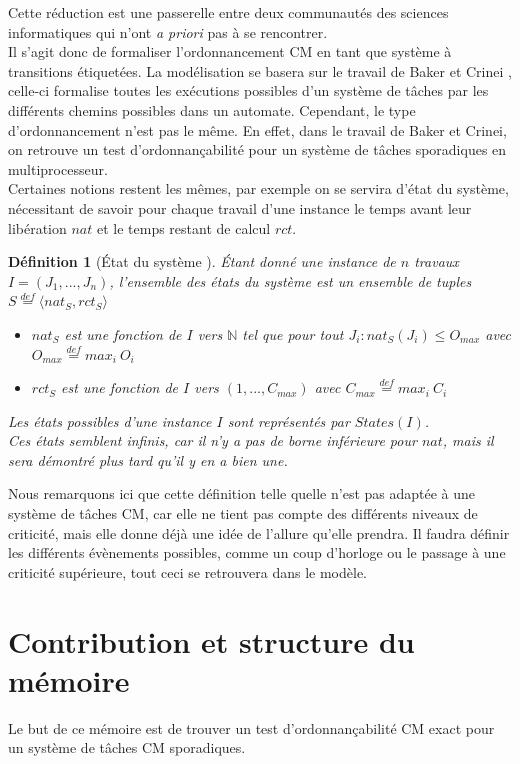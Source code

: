 \documentclass[12pt,a4paper,oneside]{book}
\theoremstyle{break}
\newtheorem{defin}{Définition}[chapter]
\theoremstyle{breakplain}
\begin{document}
Cette réduction est une passerelle entre deux communautés des sciences informatiques qui n'ont \textit{a priori} pas à se rencontrer.\\

Il s'agit donc de formaliser l'ordonnancement CM en tant que système à transitions étiquetées. La modélisation se basera sur le travail de Baker et Crinei \cite{bakerbrute}, celle-ci formalise toutes les exécutions possibles d'un système de tâches par les différents chemins possibles dans un automate. Cependant, le type d'ordonnancement n'est pas le même. En effet, dans le travail de Baker et Crinei, on retrouve un test d'ordonnançabilité pour un système de tâches sporadiques en multiprocesseur.\\

Certaines notions restent les mêmes, par exemple on se servira d'état du système, nécessitant de savoir pour chaque travail d'une instance le temps avant leur libération $nat$ et le temps restant de calcul $rct$.\\

\begin{defin}[État du système \cite{geeraerts2013multiprocessor}]
Étant donné une instance de $n$ travaux $I = (J_1, ..., J_n)$, l'ensemble des états du système est un ensemble de tuples $S \overset{def}{=} \langle nat_S, rct_S \rangle$
\begin{itemize}
\item $nat_S$ est une fonction de $I$ vers $\mathbb{N}$ tel que pour tout $J_i : nat_S(J_i) \leq O_{max}$ avec $O_{max} \overset{def}{=} max_i\ O_i$
\item $rct_S$ est une fonction de $I$ vers $(1,...,C_{max})$ avec $C_{max} \overset{def}{=} max_i\ C_i$
\end{itemize}
Les états possibles d'une instance $I$ sont représentés par $States(I)$.\\
Ces états semblent infinis, car il n'y a pas de borne inférieure pour $nat$, mais il sera démontré plus tard qu'il y en a bien une.
\end{defin}
Nous remarquons ici que cette définition telle quelle n'est pas adaptée à une système de tâches CM, car elle ne tient pas compte des différents niveaux de criticité, mais elle donne déjà une idée de l'allure qu'elle prendra. Il faudra définir les différents évènements possibles, comme un coup d'horloge ou le passage à une criticité supérieure, tout ceci se retrouvera dans le modèle.



\section{Contribution et structure du mémoire}
Le but de ce mémoire est de trouver un test d'ordonnançabilité CM exact pour un système de tâches CM sporadiques.\\
\end{document}
